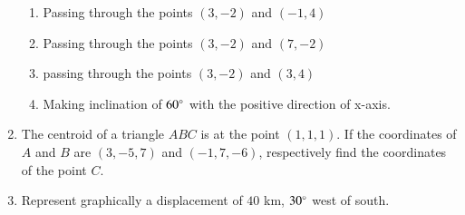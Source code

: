\begin{enumerate}[label=\thesubsection.\arabic*,ref=\thesubsection.\theenumi]
\begin{enumerate}
\item  Passing through the points $(3,-2)$ and $(-1,4)$
\item  Passing through the points $(3,-2)$ and $(7,-2)$
\item  passing through the points $(3,-2)$ and $(3,4)$	
\item  Making inclination of $60\degree$ with the positive direction of x-axis.
\end{enumerate}
\item The centroid of a triangle $ABC$ is at the point $(1,1,1)$. If the coordinates of $A$ and $B$ are $(3,-5,7)$ and $(-1,7,-6)$, respectively find the coordinates of the point $C$.
\item Represent graphically a displacement of $40$ km, $30\degree$ west of south.
\end{enumerate}
